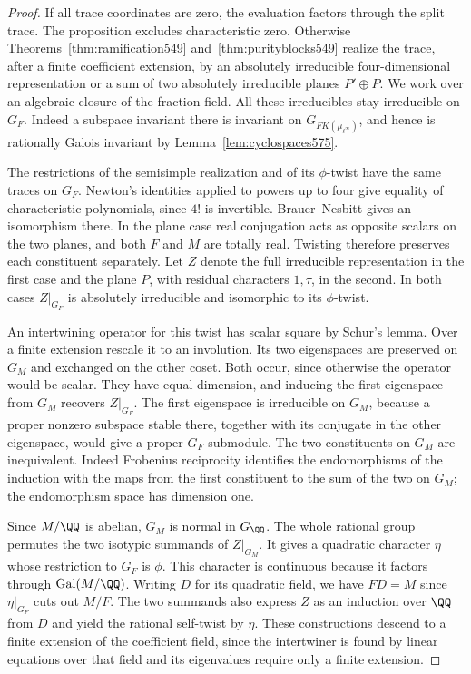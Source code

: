 \documentclass[a4paper,11pt]{article}
\theoremstyle{definition}
\theoremstyle{remark}
\numberwithin{equation}{section}
\begin{document}
\begin{proof}
If all trace coordinates are zero, the evaluation factors
through the split trace. The proposition excludes characteristic
zero. Otherwise Theorems~\ref{thm:ramification549}
and~\ref{thm:purityblocks549} realize the trace, after a
finite coefficient extension, by an absolutely irreducible
four-dimensional representation or a sum of two absolutely
irreducible planes \(P'\oplus P\). We work over an algebraic
closure of the fraction field. All these irreducibles stay
irreducible on \(G_F\). Indeed a subspace invariant there
is invariant on \(G_{FK(\mu_{\ell^\infty})}\), and hence is
rationally Galois invariant by Lemma~\ref{lem:cyclospaces575}.

The restrictions of the semisimple realization and of its
\(\phi\)-twist have the same traces on \(G_F\). Newton's
identities applied to powers up to four give equality of
characteristic polynomials, since \(4!\) is invertible.
Brauer--Nesbitt gives an isomorphism there. In the plane
case real conjugation acts as opposite scalars on the two
planes, and both \(F\) and \(M\) are totally real. Twisting
therefore preserves each constituent separately. Let \(Z\)
denote the full irreducible representation in the first case
and the plane \(P\), with residual characters \(1,\tau\), in
the second. In both cases \(Z|_{G_F}\) is absolutely
irreducible and isomorphic to its \(\phi\)-twist.

An intertwining operator for this twist has scalar square by
Schur's lemma. Over a finite extension rescale it to an
involution. Its two eigenspaces are preserved on \(G_M\)
and exchanged on the other coset. Both occur, since otherwise
the operator would be scalar. They have equal dimension, and
inducing the first eigenspace from \(G_M\) recovers \(Z|_{G_F}\).
The first eigenspace is irreducible on \(G_M\), because a
proper nonzero subspace stable
there, together with its conjugate in the other eigenspace,
would give a proper \(G_F\)-submodule. The two constituents
on \(G_M\) are inequivalent. Indeed Frobenius reciprocity
identifies the endomorphisms of the induction with the maps
from the first constituent to the sum of the two on \(G_M\);
the endomorphism space has dimension one.

Since \(M/\QQ\) is abelian, \(G_M\) is normal in \(G_\QQ\).
The whole rational group permutes the two isotypic summands
of \(Z|_{G_M}\). It gives a quadratic character \(\eta\)
whose restriction to \(G_F\) is \(\phi\). This character is
continuous because it factors through \(\operatorname{Gal}(M/\QQ)\).
Writing \(D\) for its quadratic field, we have \(FD=M\)
since \(\eta|_{G_F}\) cuts out \(M/F\). The two summands
also express \(Z\) as an
induction over \(\QQ\) from \(D\) and yield the rational
self-twist by \(\eta\). These constructions descend to a
finite extension of the coefficient field, since the
intertwiner is found by linear equations over that field
and its eigenvalues require only a finite extension.


\end{proof}
\end{document}
